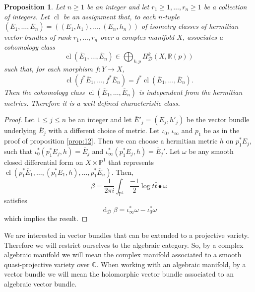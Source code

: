 \documentclass[10pt,twoside]{article}
\numberwithin{equation}{section}
\theoremstyle{plain}
\newtheorem{proposition}[equation]{Proposition}
\theoremstyle{definition}
\DeclareMathOperator{\dd}{d}
\DeclareMathOperator{\cl}{cl}
\begin{document}
\begin{proposition} \label{prop:22}
  Let $n\ge 1$ be an integer and let $r_1\ge 1,\dots ,r_n\ge 1$ be a
  collection of integers.
  Let $\cl$ be an assignment that, to each $n$-tuple
  $(\overline E_{1},\dots,\overline
  E_{n})=((E_{1},h_{1}),\dots,(E_{n},h_{n}))$ of isometry classes of
  hermitian   
  vector bundles of rank $r_{1},\dots,r_{n}$ over a complex manifold
  $X$, associates a cohomology class 
  \begin{displaymath}
    \cl (\overline
  E_{1},\dots,\overline E_{n})\in \bigoplus_{k,p}
  H_{\mathcal{D}}^{k}(X,\mathbb{R}(p))
  \end{displaymath}
  such that, for each morphism $f:Y\to X$,
  \begin{displaymath}
    \cl (f^{\ast}\overline
  E_{1},\dots,f^{\ast} \overline E_{n}) = f^{\ast}\cl (\overline
  E_{1},\dots,\overline E_{n}).
  \end{displaymath}
Then the cohomology class $\cl (\overline
  E_{1},\dots,\overline E_{n})$
  is independent from the hermitian metrics. Therefore it is a well
  defined characteristic class.
\end{proposition}
\begin{proof}
  Let $1\le j \le n$ be an integer and let $\overline
  E'_{j}=(E_{j},h'_{j})$ be the 
  vector bundle underlying $\overline E_{j}$ with a different choice of
  metric. Let $\iota_{0}$, $\iota_{\infty}$ and $p_{1}$ be as in the
  proof of proposition 
  \ref{prop:12}. Then we can choose a hermitian metric $h$ on
  $p_{1}^{\ast}E_{j}$,  such that $\iota
  _{0}^{\ast}(p_{1}^{\ast}E_{j},h)=\overline E_{j}$ and $\iota
  _{\infty}^{\ast}(p_{1}^{\ast}E_{j},h)=\overline E_{j}'$. Let $\omega
  $ be any smooth closed differential form on $X\times \mathbb{P}^{1}$
  that represents  
  $
    \cl (p_{1}^{\ast}\overline
    E_{1},\dots,(p_{1}^{\ast}E_{1},h),\dots,p_{1}^{\ast}\overline
    E_{n}).
  $
  Then,
  \begin{displaymath}
    \beta =\frac{1}{2\pi i}\int_{\mathbb{P}^{1}}
    \frac{-1}{2}\log t\bar t\bullet \omega
  \end{displaymath}
  satisfies
  \begin{displaymath}
    \dd_{\mathcal{D}}\beta 
    = \iota_{\infty}^{\ast}\omega -\iota^{\ast}_{0}\omega 
  \end{displaymath}
  which implies the result.
\end{proof}


We are interested in vector bundles that can be extended to a
projective variety. Therefore we will restrict ourselves to the
algebraic category. So,
by a complex algebraic manifold we will mean the complex manifold
associated to a smooth quasi-projective variety over
$\mathbb{C}$. When working with an algebraic manifold,
by a vector bundle  we will mean
the holomorphic vector bundle associated to an algebraic
vector bundle.
\end{document}
